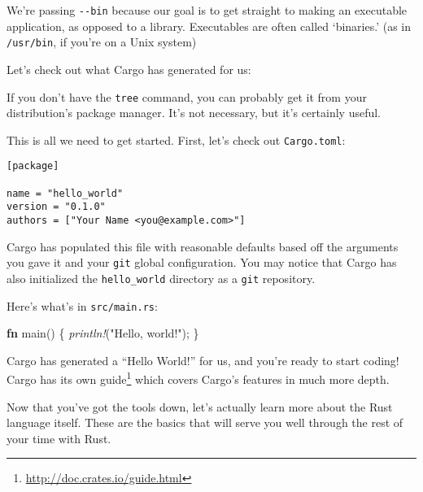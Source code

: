 \documentclass[a4paper,]{book}
\newenvironment{Shaded}{\begin{snugshade}}{\end{snugshade}}
\newcommand{\KeywordTok}[1]{\textcolor[rgb]{0.13,0.29,0.53}{\textbf{{#1}}}}
\newcommand{\StringTok}[1]{\textcolor[rgb]{0.31,0.60,0.02}{{#1}}}
\newcommand{\PreprocessorTok}[1]{\textcolor[rgb]{0.56,0.35,0.01}{\textit{{#1}}}}
\newcommand{\NormalTok}[1]{{#1}}
\renewcommand{\href}[2]{#2\footnote{\url{#1}}}
\begin{document}
We're passing \texttt{-\/-bin} because our goal is to get straight to
making an executable application, as opposed to a library. Executables
are often called `binaries.' (as in \texttt{/usr/bin}, if you're on a
Unix system)

Let's check out what Cargo has generated for us:

\begin{Shaded}
\end{Shaded}

If you don't have the \texttt{tree} command, you can probably get it
from your distribution's package manager. It's not necessary, but it's
certainly useful.

This is all we need to get started. First, let's check out
\texttt{Cargo.toml}:

\begin{verbatim}
[package]

name = "hello_world"
version = "0.1.0"
authors = ["Your Name <you@example.com>"]
\end{verbatim}

Cargo has populated this file with reasonable defaults based off the
arguments you gave it and your \texttt{git} global configuration. You
may notice that Cargo has also initialized the \texttt{hello\_world}
directory as a \texttt{git} repository.

Here's what's in \texttt{src/main.rs}:

\begin{Shaded}
\begin{Highlighting}[]
\KeywordTok{fn} \NormalTok{main() \{}
    \PreprocessorTok{println!}\NormalTok{(}\StringTok{"Hello, world!"}\NormalTok{);}
\NormalTok{\}}
\end{Highlighting}
\end{Shaded}

Cargo has generated a ``Hello World!'' for us, and you're ready to start
coding! Cargo has its own \href{http://doc.crates.io/guide.html}{guide}
which covers Cargo's features in much more depth.

Now that you've got the tools down, let's actually learn more about the
Rust language itself. These are the basics that will serve you well
through the rest of your time with Rust.
\end{document}

